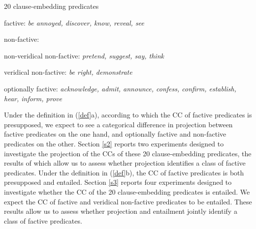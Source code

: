 \documentclass[11pt,fleqn]{article}
\newcommand{\6}{\mbox{$[\hspace*{-.6mm}[$}}
\newcommand{\9}{\mbox{$]\hspace*{-.6mm}]$}}
\begin{document}
\begin{exe}
\ex\label{pred} 20 clause-embedding predicates 

\begin{xlist}

\ex factive: {\em be annoyed, discover, know, reveal, see}

\ex non-factive:

\begin{xlist}

\ex non-veridical non-factive: {\em pretend, suggest, say, think}

\ex veridical non-factive: {\em be right, demonstrate}

\end{xlist}

\ex optionally factive: {\em acknowledge, admit, announce, confess, confirm, establish, hear, inform, prove}

\end{xlist}

\end{exe}
%
%
%

Under the definition in (\ref{def}a), according to which the CC of factive predicates is presupposed, we expect to see a categorical difference in projection between factive predicates on the one hand, and optionally factive and non-factive predicates on the other. Section \ref{s2} reports two experiments designed to investigate the projection of the CCs of these 20 clause-embedding predicates, the results of which allow us to assess whether projection identifies a class of factive predicates. Under the definition in (\ref{def}b), the CC of factive predicates is both presupposed and entailed. Section \ref{s3} reports four experiments designed to investigate whether the CC of the 20 clause-embedding predicates is entailed. We expect the CC of factive and veridical non-factive predicates to be entailed. These results allow us to assess whether projection and entailment jointly identify a class of factive predicates.
\end{document}
